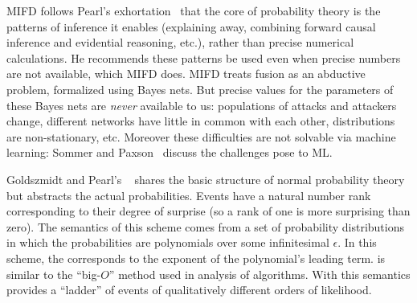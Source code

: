 
MIFD
follows Pearl's exhortation~ that the core of probability theory is
the patterns of inference it enables (explaining away, combining forward causal
inference and evidential reasoning, etc.), rather than precise numerical
calculations.  He recommends these patterns be used even when precise numbers are
not available, which MIFD does.
MIFD treats
\ids fusion as an abductive problem, formalized using Bayes nets.
But precise values for the parameters of these Bayes nets
are \emph{never} available to us: populations of
attacks and attackers change, different networks have little in common with each other, distributions are
non-stationary, etc.  Moreover these difficulties are not solvable via machine learning:
Sommer and Paxson~ discuss the challenges \ids pose to ML.

Goldszmidt and
Pearl's \zplus{}~
shares the
basic structure of normal probability theory but abstracts the actual
probabilities.
Events have a natural number rank \tkappa{}
corresponding to their degree of surprise (so a rank of one is more surprising
than zero). The semantics of this scheme comes from a set of probability
distributions in which the probabilities are polynomials over some infinitesimal
$\epsilon$. In this scheme, the \tkappa{} corresponds to the exponent
of the polynomial's leading term.
\zplus is similar to the ``big-$O$'' method used
in analysis of algorithms.
With this semantics \zplus{}
provides a ``ladder'' of events of qualitatively different
orders of likelihood.

